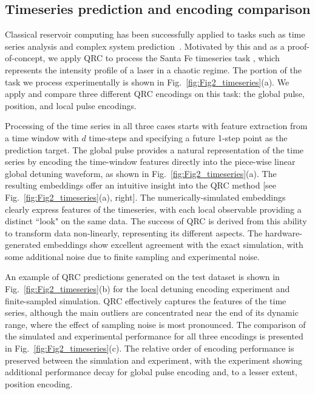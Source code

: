 \documentclass[english,floatfix,twocolumn,showpacs, aps, prx, reprint, superscriptaddress, longbibliography]{revtex4-2}
\begin{document}
\subsection*{Timeseries prediction and encoding comparison}


Classical reservoir computing has been successfully applied to tasks such as time series analysis and complex system prediction~\cite{Antonik2018, Nadiga2021, Viehweg2023, Arcomano2023}. Motivated by this and as a proof-of-concept, we apply QRC to process the Santa Fe timeseries task \cite{Weigend1993-bg}, which represents the intensity profile of a laser in a chaotic regime. The portion of the task we process experimentally is shown in Fig.~\ref{fig:Fig2_timeseries}(a).  We apply and compare three different QRC encodings on this task: the global pulse, position, and local pulse encodings.

Processing of the time series in all three cases starts with feature extraction from a time window with $d$ time-steps and specifying a future 1-step point as the prediction target. The global pulse provides a natural representation of the time series by encoding the time-window features directly into the piece-wise linear global detuning waveform, as shown in Fig.~\ref{fig:Fig2_timeseries}(a). The resulting embeddings offer an intuitive insight into the QRC method [see Fig.~\ref{fig:Fig2_timeseries}(a), right]. The numerically-simulated embeddings clearly express features of the timeseries, with each local observable providing a distinct ``look" on the same data.  The success of QRC is derived from this ability to transform data non-linearly, representing its different aspects. The hardware-generated embeddings show excellent agreement with the exact simulation, with some additional noise due to finite sampling and experimental noise.

An example of QRC predictions generated on the test dataset is shown in Fig.~\ref{fig:Fig2_timeseries}(b) for the local detuning encoding experiment and finite-sampled simulation. QRC effectively captures the features of the time series, although the main outliers are concentrated near the end of its dynamic range, where the effect of sampling noise is most pronounced. The comparison of the simulated and experimental performance for all three encodings is presented in Fig.~\ref{fig:Fig2_timeseries}(c). The relative order of encoding performance is preserved between the simulation and experiment, with the experiment showing additional performance decay for global pulse encoding and, to a lesser extent, position encoding.
\end{document}
